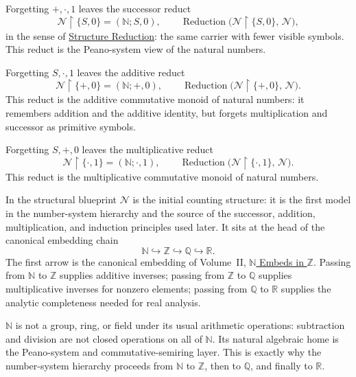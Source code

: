 \begin{remark*}
Forgetting $+,\cdot,1$ leaves the successor reduct
\[
\mathcal{N}\!\restriction\!\{S,0\}
=
(\mathbb{N};S,0),
\qquad
\operatorname{Reduction}\!\bigl(\mathcal{N}\!\restriction\!\{S,0\},\,\mathcal{N}\bigr),
\]
in the sense of \hyperref[def:structure-reduction]{Structure Reduction}: the
same carrier with fewer visible symbols. This reduct is the Peano-system view
of the natural numbers.
\end{remark*}

\begin{remark*}
Forgetting $S,\cdot,1$ leaves the additive reduct
\[
\mathcal{N}\!\restriction\!\{+,0\}
=
(\mathbb{N};+,0),
\qquad
\operatorname{Reduction}\!\bigl(\mathcal{N}\!\restriction\!\{+,0\},\,\mathcal{N}\bigr).
\]
This reduct is the additive commutative monoid of natural numbers: it remembers
addition and the additive identity, but forgets multiplication and successor as
primitive symbols.
\end{remark*}

\begin{remark*}
Forgetting $S,+,0$ leaves the multiplicative reduct
\[
\mathcal{N}\!\restriction\!\{\cdot,1\}
=
(\mathbb{N};\cdot,1),
\qquad
\operatorname{Reduction}\!\bigl(\mathcal{N}\!\restriction\!\{\cdot,1\},\,\mathcal{N}\bigr).
\]
This reduct is the multiplicative commutative monoid of natural numbers.
\end{remark*}

\begin{remark*}
In the structural blueprint $\mathcal{N}$ is the initial counting structure: it is
the first model in the number-system hierarchy and the source of the successor,
addition, multiplication, and induction principles used later. It sits at the head
of the canonical embedding chain
\[
\mathbb{N}\hookrightarrow\mathbb{Z}\hookrightarrow\mathbb{Q}\hookrightarrow\mathbb{R}.
\]
The first arrow is the canonical embedding of Volume~II,
\hyperref[thm:n-embeds-in-z]{$\mathbb{N}$ Embeds in $\mathbb{Z}$}. Passing
from $\mathbb{N}$ to $\mathbb{Z}$ supplies additive inverses; passing from
$\mathbb{Z}$ to $\mathbb{Q}$ supplies multiplicative inverses for nonzero
elements; passing from $\mathbb{Q}$ to $\mathbb{R}$ supplies the analytic
completeness needed for real analysis.
\end{remark*}

\begin{remark*}[Interpretation]
$\mathbb{N}$ is not a group, ring, or field under its usual arithmetic operations:
subtraction and division are not closed operations on all of $\mathbb{N}$. Its
natural algebraic home is the Peano-system and commutative-semiring layer.
This is exactly why the number-system hierarchy proceeds from
$\mathbb{N}$ to $\mathbb{Z}$, then to $\mathbb{Q}$, and finally to
$\mathbb{R}$.
\end{remark*}
